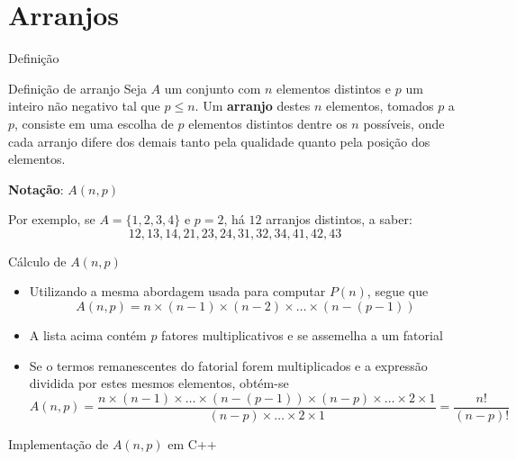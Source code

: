 \section{Arranjos}

\begin{frame}[fragile]{Definição}

    \begin{block}{Definição de arranjo}
        Seja $A$ um conjunto com $n$ elementos distintos e $p$ um inteiro não negativo tal que 
        $p \leq n$.  Um \textbf{arranjo} destes $n$ elementos, tomados $p$ a $p$, consiste em uma 
        escolha de $p$ elementos distintos dentre os $n$ possíveis, onde cada arranjo difere dos 
        demais tanto pela qualidade quanto pela posição dos elementos.


        \textbf{Notação}: $A(n, p)$
    \end{block}

    \vspace{0.1in}

    Por exemplo, se $A = \{1, 2, 3, 4\}$ e $p = 2$, há $12$ arranjos distintos, a saber:
    $$
    12, 13, 14, 21, 23, 24, 31, 32, 34, 41, 42, 43
    $$
\end{frame}

\begin{frame}[fragile]{Cálculo de $A(n, p)$}

    \begin{itemize}
        \item Utilizando a mesma abordagem usada para computar $P(n)$, segue que
$$
        A(n, p) = n \times (n - 1) \times (n - 2) \times \ldots \times (n - (p - 1))
$$

        \item A lista acima contém $p$ fatores multiplicativos e se assemelha a um fatorial

        \item Se o termos remanescentes do fatorial forem multiplicados e a expressão dividida por
            estes mesmos elementos, obtém-se
$$
        A(n, p) = \frac{n \times (n - 1) \times \ldots \times (n - (p - 1)) \times (n - p) \times \ldots \times 2 \times 1}{(n - p) \times \ldots \times 2 \times 1} = \frac{n!}{(n - p)!}
$$
    \end{itemize}

\end{frame}

\begin{frame}[fragile]{Implementação de $A(n, p)$ em C++}
\end{frame}

